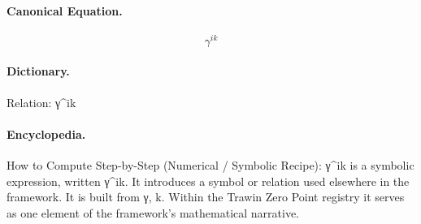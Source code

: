 \paragraph{Canonical Equation.}
\[
\gamma^{ik}
\]

\paragraph{Dictionary.}
Relation: γ\textasciicircum{}ik

\paragraph{Encyclopedia.}
How to Compute Step-by-Step (Numerical / Symbolic Recipe): γ\textasciicircum{}ik is a symbolic expression, written γ\textasciicircum{}ik. It introduces a symbol or relation used elsewhere in the framework. It is built from γ, k. Within the Trawin Zero Point registry it serves as one element of the framework's mathematical narrative.
